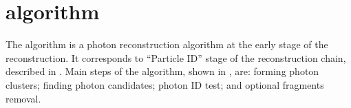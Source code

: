 



\section{\PhotonReconstruction algorithm}
\label{sec:photonRecostrcution}


The \PhotonReconstruction algorithm is a photon reconstruction  algorithm at the early stage of the reconstruction. It corresponds to ``Particle ID'' stage of the \pandora reconstruction chain, described in .  Main steps of the \PhotonReconstruction algorithm, shown in , are:  forming photon clusters; finding photon candidates; photon ID test; and optional fragments removal.


